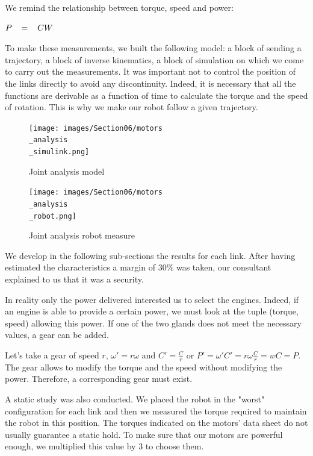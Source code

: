 We remind the relationship between torque, speed and power: 
\begin{center}
    $P\hspace{0.3cm}=\hspace{0.3cm}CW$    
\end{center}

\bigbreak
To make these measurements, we built the following model: a block of sending a trajectory, a block of inverse kinematics, a block of simulation on which we come to carry out the measurements. It was important not to control the position of the links directly to avoid any discontinuity. Indeed, it is necessary that all the functions are derivable as a function of time to calculate the torque and the speed of rotation. This is why we make our robot follow a given trajectory.
\begin{figure}[ht]
    \centering
    \texttt{[image: images/Section06/motors\\\_analysis\\\_simulink.png]}
    \caption{Joint analysis model}
    \label{fig:mesh15}
\end{figure}
\FloatBarrier

\begin{figure}[ht]
    \centering
    \texttt{[image: images/Section06/motors\\\_analysis\\\_robot.png]}
    \caption{Joint analysis robot measure}
    \label{fig:mesh15}
\end{figure}
\FloatBarrier


\bigbreak
We develop in the following sub-sections the results for each link. After having estimated the characteristics a margin of 30\% was taken, our consultant explained to us that it was a security. 

\bigbreak
In reality only the power delivered interested us to select the engines. Indeed, if an engine is able to provide a certain power, we must look at the tuple (torque, speed) allowing this power. If one of the two glands does not meet the necessary values, a gear can be added. 

\bigbreak
Let's take a gear of speed $r$, $\omega'= r\omega$ and $C'= \frac{C}{r}$ or $P'= \omega'C'=r\omega\frac{C}{r} = wC = P$. The gear allows to modify the torque and the speed without modifying the power. Therefore, a corresponding gear must exist.

\bigbreak
A static study was also conducted. We placed the robot in the "worst" configuration for each link and then we measured the torque required to maintain the robot in this position. The torques indicated on the motors' data sheet do not usually guarantee a static hold. To make sure that our motors are powerful enough, we multiplied this value by 3 to choose them. 


